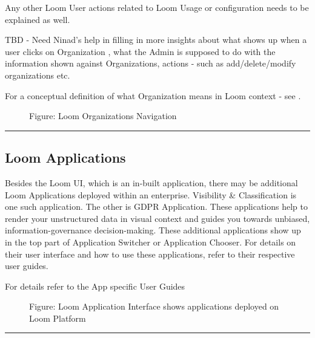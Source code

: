\documentclass[letterpaper,10pt,english]{sphinxmanual}
\begin{document}
Any other Loom User actions related to Loom Usage or configuration needs to be explained as well.

TBD - Need Ninad’s help in filling in more insights about what shows up when a user clicks on Organization , what the Admin is supposed to do with the information
shown against Organizations, actions - such as add/delete/modify organizations etc.

For a conceptual definition of what Organization means in Loom context - see .

\begin{figure}[htbp]
\centering
\capstart

\noindent{}
\caption{Figure: Loom Organizations Navigation}\label{\detokenize{loom_getting_started_guide:id29}}\end{figure}


\bigskip\hrule\bigskip



\subsection{Loom Applications}
\label{\detokenize{loom_getting_started_guide:loom-applications}}
Besides the Loom UI, which is an in-built application, there may be additional Loom Applications deployed within an enterprise.  Visibility \& Classification is one such application.  The other is GDPR Application.  These applications help to render your unstructured data in visual context and guides you towards unbiased, information-governance decision-making. These additional applications show up in the top part of Application Switcher or Application Chooser.  For details on their user interface and how to use these applications, refer to their respective user guides.

For details refer to the App specific User Guides 

\begin{figure}[htbp]
\centering
\capstart

\noindent{}
\caption{Figure: Loom Application Interface shows applications deployed on Loom Platform}\label{\detokenize{loom_getting_started_guide:id30}}\end{figure}


\bigskip\hrule\bigskip
\end{document}
